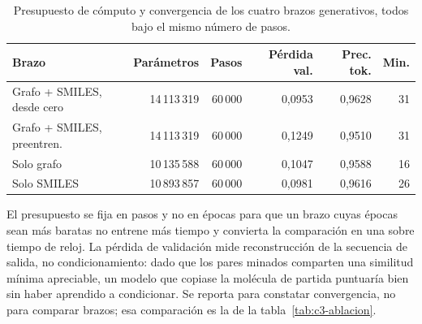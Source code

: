 \begin{table}[htbp]
  \centering
  \caption{Presupuesto de cómputo y convergencia de los cuatro brazos
           generativos, todos bajo el mismo número de pasos.}
  \label{tab:c4-presupuesto}
  \setlength{\tabcolsep}{5pt}
  \footnotesize
  \begin{tabular}{@{}lrrrrr@{}}
    \toprule
    Brazo & Parámetros & Pasos & Pérdida val. & Prec. tok. & Min. \\
    \midrule
    Grafo + SMILES, desde cero   & 14\,113\,319 & 60\,000 & 0,0953 & 0,9628 & 31 \\
    Grafo + SMILES, preentren.   & 14\,113\,319 & 60\,000 & 0,1249 & 0,9510 & 31 \\
    Solo grafo                   & 10\,135\,588 & 60\,000 & 0,1047 & 0,9588 & 16 \\
    Solo SMILES                  & 10\,893\,857 & 60\,000 & 0,0981 & 0,9616 & 26 \\
    \bottomrule
  \end{tabular}

  \vspace{0.5em}
  \begin{minipage}{0.92\textwidth}
    \footnotesize
    El presupuesto se fija en pasos y no en épocas para que un brazo cuyas épocas sean
    más baratas no entrene más tiempo y convierta la comparación en una sobre tiempo de
    reloj. La pérdida de validación mide reconstrucción de la secuencia de salida, no
    condicionamiento: dado que los pares minados comparten una similitud mínima
    apreciable, un modelo que copiase la molécula de partida puntuaría bien sin haber
    aprendido a condicionar. Se reporta para constatar convergencia, no para comparar
    brazos; esa comparación es la de la tabla~\ref{tab:c3-ablacion}.
  \end{minipage}
\end{table}
